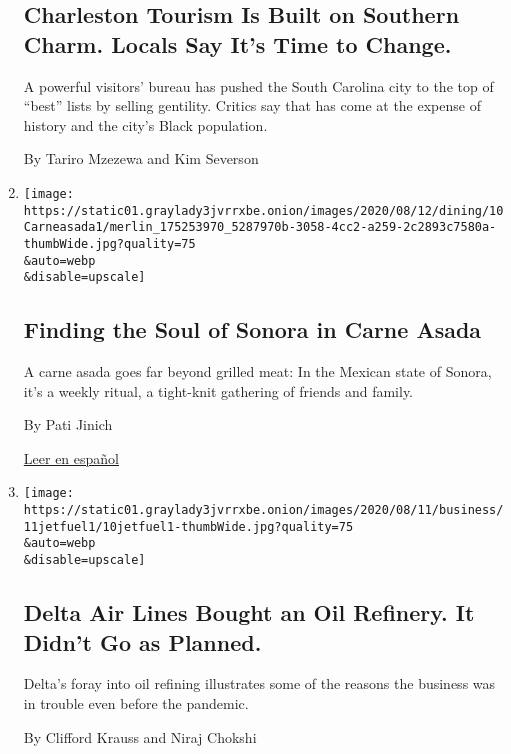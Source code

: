 \begin{enumerate}
  \hypertarget{charleston-tourism-is-built-on-southern-charm-locals-say-its-time-to-change}{%
  \subsection{Charleston Tourism Is Built on Southern Charm. Locals Say
  It's Time to
  Change.}\label{charleston-tourism-is-built-on-southern-charm-locals-say-its-time-to-change}}

  A powerful visitors' bureau has pushed the South Carolina city to the
  top of ``best'' lists by selling gentility. Critics say that has come
  at the expense of history and the city's Black population.

  By Tariro Mzezewa and Kim Severson
\item
  \href{/2020/08/11/dining/carne-asada-sonora.html}{}

  \texttt{[image: https://static01.graylady3jvrrxbe.onion/images/2020/08/12/dining/10Carneasada1/merlin\_175253970\_5287970b-3058-4cc2-a259-2c2893c7580a-thumbWide.jpg?quality=75\\\&auto=webp\\\&disable=upscale]}

  \hypertarget{finding-the-soul-of-sonora-in-carne-asada}{%
  \subsection{Finding the Soul of Sonora in Carne
  Asada}\label{finding-the-soul-of-sonora-in-carne-asada}}

  A carne asada goes far beyond grilled meat: In the Mexican state of
  Sonora, it's a weekly ritual, a tight-knit gathering of friends and
  family.

  By Pati Jinich

  \href{https://www.nytimes3xbfgragh.onion/es/2020/08/14/espanol/sonora-carne-asada.html}{Leer
  en español}
\item
  \href{/2020/08/10/business/energy-environment/delta-oil-refinery-jet-fuel.html}{}

  \texttt{[image: https://static01.graylady3jvrrxbe.onion/images/2020/08/11/business/11jetfuel1/10jetfuel1-thumbWide.jpg?quality=75\\\&auto=webp\\\&disable=upscale]}

  \hypertarget{delta-air-lines-bought-an-oil-refinery-it-didnt-go-as-planned}{%
  \subsection{Delta Air Lines Bought an Oil Refinery. It Didn't Go as
  Planned.}\label{delta-air-lines-bought-an-oil-refinery-it-didnt-go-as-planned}}

  Delta's foray into oil refining illustrates some of the reasons the
  business was in trouble even before the pandemic.

  By Clifford Krauss and Niraj Chokshi
\end{enumerate}


